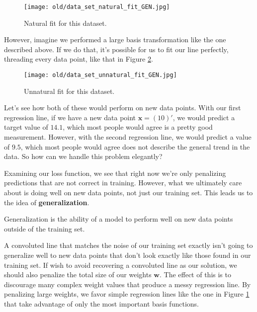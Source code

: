 \begin{figure}
    \centering
    \texttt{[image: old/data\_set\_natural\_fit\_GEN.jpg]}
    \caption{Natural fit for this dataset.}
    \label{fig:data-set-natural-fit}
\end{figure}

However, imagine we performed a large basis transformation like the one described above. If we do that, it's possible for us to fit our line perfectly, threading every data point, like that in Figure \ref{fig:data-set-unnatural-fit}.

\begin{figure}
    \centering
    \texttt{[image: old/data\_set\_unnatural\_fit\_GEN.jpg]}
    \caption{Unnatural fit for this dataset.}
    \label{fig:data-set-unnatural-fit}
\end{figure}

Let's see how both of these would perform on new data points. With our first regression line, if we have a new data point $\bm{x} = (10)'$, we would predict a target value of $\bm{14.1}$, which most people would agree is a pretty good measurement. However, with the second regression line, we would predict a value of $\bm{9.5}$, which most people would agree does not describe the general trend in the data. So how can we handle this problem elegantly?

Examining our loss function, we see that right now we're only penalizing predictions that are not correct in training. However, what we ultimately care about is doing well on new data points, not just our training set. This leads us to the idea of \textbf{generalization}.

\begin{definition}[generalization]
    Generalization is the ability of a model to perform well on new data points outside of the training set.
\end{definition}

A convoluted line that matches the noise of our training set exactly isn't going to generalize well to new data points that don't look exactly like those found in our training set. If wish to avoid recovering a convoluted line as our solution, we should also penalize the total size of our weights $\bm{w}$. The effect of this is to discourage many complex weight values that produce a messy regression line. By penalizing large weights, we favor simple regression lines like the one in Figure \ref{fig:data-set-natural-fit} that take advantage of only the most important basis functions.

